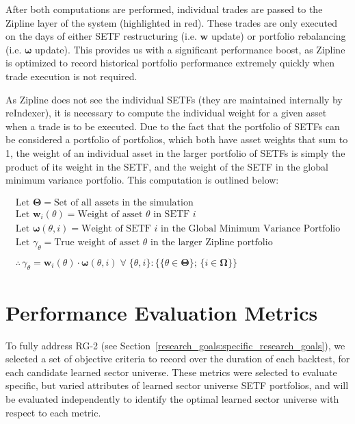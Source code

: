 \documentclass[../main.tex]{subfiles}
\begin{document}
After both computations are performed, individual trades are passed to the Zipline layer of the system (highlighted in red). These trades are only executed on the days of either SETF restructuring (i.e. $\boldsymbol{w}$ update) or portfolio rebalancing (i.e. $\boldsymbol{\omega}$ update). This provides us with a significant performance boost, as Zipline is optimized to record historical portfolio performance extremely quickly when trade execution is not required.

As Zipline does not see the individual SETFs (they are maintained internally by reIndexer), it is necessary to compute the individual weight for a given asset when a trade is to be executed. Due to the fact that the portfolio of SETFs can be considered a portfolio of portfolios, which both have asset weights that sum to 1, the weight of an individual asset in the larger portfolio of SETFs is simply the product of its weight in the SETF, and the weight of the SETF in the global minimum variance portfolio. This computation is outlined below:

\begin{gather*}
    \text{Let $\boldsymbol{\Theta}$} = \text{Set of all assets in the simulation} \\
    \text{Let $\boldsymbol{w}_i(\theta)$} = \text{Weight of asset $\theta$ in SETF $i$} \\
    \text{Let $\boldsymbol{\omega}(\theta, i)$} = \text{Weight of SETF $i$ in the Global Minimum Variance Portfolio} \\
    \text{Let $\gamma_\theta$} = \text{True weight of asset $\theta$ in the larger Zipline portfolio}
    \\
    \\
    \therefore \, \gamma_\theta = \boldsymbol{w}_i(\theta) \cdot \boldsymbol{\omega}(\theta, i) \; \forall \; \{ \theta, i \} : \{ \{ \theta \in \boldsymbol{\Theta} \} ; \, \{ i \in \boldsymbol{\Omega} \} \}
\end{gather*}



\section{Performance Evaluation Metrics} \label{candidate_universe_ranking:eval_metrics}

To fully address RG-2 (see Section~\ref{research_goals:specific_research_goals}), we selected a set of objective criteria to record over the duration of each backtest, for each candidate learned sector universe. These metrics were selected to evaluate specific, but varied attributes of learned sector universe SETF portfolios, and will be evaluated independently to identify the optimal learned sector universe with respect to each metric.
\end{document}
